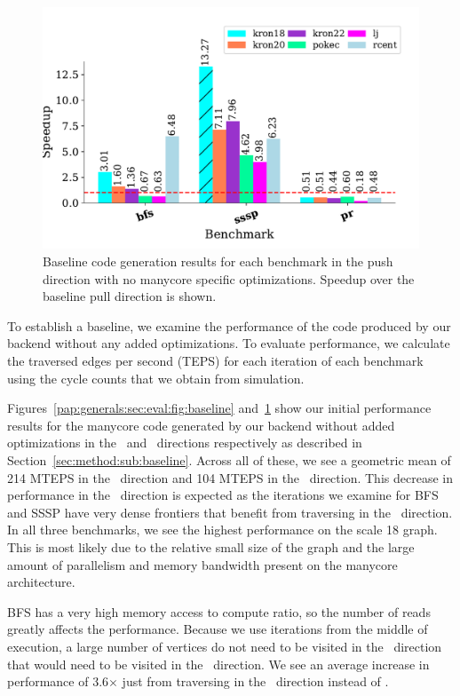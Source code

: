 \begin{figure}[h]
    \centering
    \includegraphics[scale = 0.6]{graphit-figures/push.pdf}
    \caption{Baseline code generation results for each benchmark in the push direction with no manycore specific optimizations. Speedup over the baseline pull direction is shown.}
    \label{pap:generals:sec:eval:fig:push}
\end{figure}
To establish a baseline, we examine the performance of the code produced by our backend without any added optimizations.
To evaluate performance, we calculate the traversed edges per second (TEPS) for each iteration of each benchmark using the cycle counts that we obtain from simulation.

Figures~\ref{pap:generals:sec:eval:fig:baseline} and~\ref{pap:generals:sec:eval:fig:push} show our initial performance results for the manycore code generated by our backend without added optimizations in the \pull~and \push~directions respectively as described in Section~\ref{sec:method:sub:baseline}.
Across all of these, we see a geometric mean of 214 MTEPS in the \pull~direction and 104 MTEPS in the \push~direction. 
This decrease in performance in the \push~direction is expected as the iterations we examine for BFS and SSSP have very dense frontiers that benefit from traversing in the \pull~direction.
In all three benchmarks, we see the highest performance on the \kron scale 18 graph.
This is most likely due to the relative small size of the graph and the large amount of parallelism and memory bandwidth present on the manycore architecture.
 
BFS has a very high memory access to compute ratio, so the number of reads greatly affects the performance.
Because we use iterations from the middle of execution, a large number of vertices do not need to be visited in the \pull~direction that would need to be visited in the \push~direction. %
We see an average increase in performance of 3.6$\times$ just from traversing in the \pull~direction instead of \push. 
 
